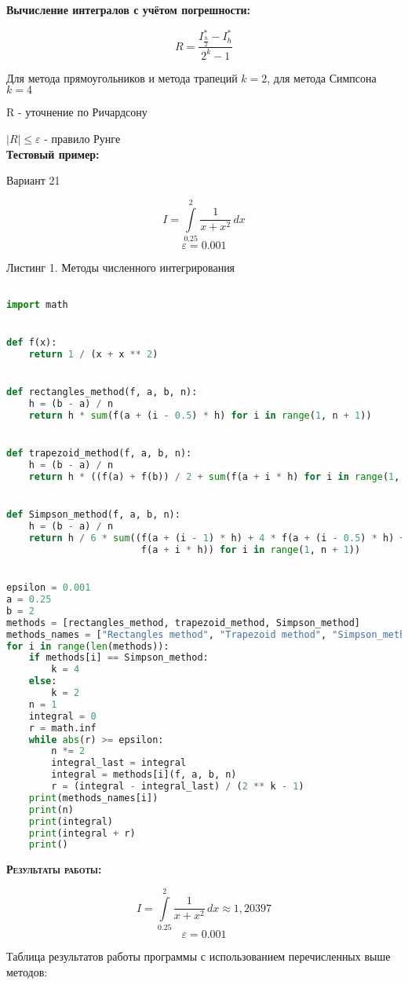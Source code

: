 \documentclass [12pt]{article}
\begin{document}
\textbf{Вычисление интегралов с учётом погрешности:}

$$R = \frac{I_{\frac{h}{2}}^* - I_h^*}{2^k - 1}$$

Для метода прямоугольников и метода трапеций $k = 2$, для метода Симпсона $k = 4$

R - уточнение по Ричардсону

$|R| \leq \varepsilon$ - правило Рунге\\

\textbf{Тестовый пример:}

Вариант 21

$$ I = \int\limits_{0.25}^2 \frac{1}{x + x^2}\,dx $$
$$\varepsilon = 0.001$$

Листинг 1. Методы численного интегрирования
\begin{lstlisting}[language=python]

import math


def f(x):
    return 1 / (x + x ** 2)


def rectangles_method(f, a, b, n):
    h = (b - a) / n
    return h * sum(f(a + (i - 0.5) * h) for i in range(1, n + 1))


def trapezoid_method(f, a, b, n):
    h = (b - a) / n
    return h * ((f(a) + f(b)) / 2 + sum(f(a + i * h) for i in range(1, n)))


def Simpson_method(f, a, b, n):
    h = (b - a) / n
    return h / 6 * sum((f(a + (i - 1) * h) + 4 * f(a + (i - 0.5) * h) +
                        f(a + i * h)) for i in range(1, n + 1))


epsilon = 0.001
a = 0.25
b = 2
methods = [rectangles_method, trapezoid_method, Simpson_method]
methods_names = ["Rectangles method", "Trapezoid method", "Simpson_method"]
for i in range(len(methods)):
    if methods[i] == Simpson_method:
        k = 4
    else:
        k = 2
    n = 1
    integral = 0
    r = math.inf
    while abs(r) >= epsilon:
        n *= 2
        integral_last = integral
        integral = methods[i](f, a, b, n)
        r = (integral - integral_last) / (2 ** k - 1)
    print(methods_names[i])
    print(n)
    print(integral)
    print(integral + r)
    print()


\end{lstlisting}


\textsc{\textbf{Результаты работы:}}

$$ I = \int\limits_{0.25}^2 \frac{1}{x + x^2}\,dx \approx 1,20397$$
$$\varepsilon = 0.001$$

Таблица результатов работы программы с использованием перечисленных выше методов:
\end{document}
